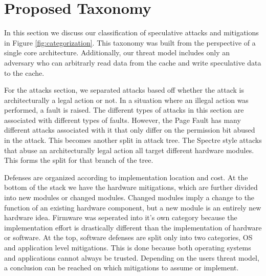 \section{Proposed Taxonomy} \label{Proposed Taxonomy}

In this section we discuss our classification of speculative attacks and mitigations in Figure \ref{fig:categorization}.
This taxonomy was built from the perspective of a single core architecture.
Additionally, our threat model includes only an adversary who can arbitrarly read data from the cache and write speculative data to the cache.

For the attacks section, we separated attacks based off whether the attack is architecturally a legal action or not.
In a situation where an illegal action was performed, a fault is raised.
The different types of attacks in this section are associated with different types of faults.
However, the Page Fault has many different attacks associated with it that only differ on the permission bit abused in the attack.
This becomes another split in attack tree.
The Spectre style attacks that abuse an architecturally legal action all target different hardware modules.
This forms the split for that branch of the tree.

Defenses are organized according to implementation location and cost.
At the bottom of the stack we have the hardware mitigations, which are further divided into new modules or changed modules.
Changed modules imply a change to the function of an existing hardware component, but a new module is an entirely new hardware idea.
Firmware was seperated into it's own category because the implementation effort is drastically different than the implementation of hardware or software.
At the top, software defenses are split only into two categories, OS and application level mitigations.
This is done because both operating systems and applications cannot always be trusted.
Depending on the users threat model, a conclusion can be reached on which mitigations to assume or implement.

